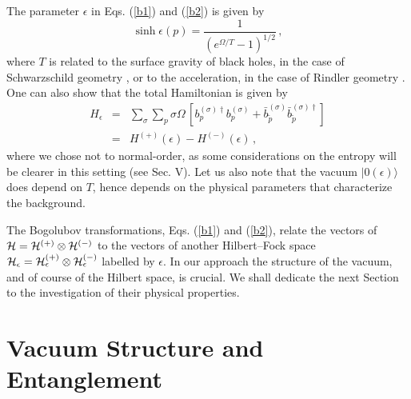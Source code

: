 \noindent The parameter $\epsilon$ in Eqs. (\ref{b1}) and
(\ref{b2}) is given by
\begin{equation}\label{boson-stat}
 \sinh \epsilon (p)= \frac{1}{(e^{\Omega/T}-1)^{1/2}}\,,
\end{equation}
where $T$ is related to the surface gravity of black holes, in the
case of Schwarzschild geometry \cite{HAW}, or to the acceleration,
in the case of Rindler geometry \cite{Unruh:db}. One can also show
that the total Hamiltonian is given by
\cite{birrell,HAW,Davies:1974th,Unruh:db,TAK,Iorio:2001te,umezawa}
\begin{eqnarray}
  H_{\epsilon} & = & \sum_{\sigma}\sum_p \sigma \Omega \,[ b_p^{(\sigma)
 \dagger} b_p^{(\sigma)} +
 \bar{b}_{\tilde{p}}^{(\sigma)}
 \bar{b}_{\tilde{p}}^{(\sigma)\dagger}] \nonumber \\
 &=& H^{(+)}(\epsilon) - H^{(-)}(\epsilon) \,{,}
 \label{hamrin}
 \end{eqnarray}
where we chose not to normal-order, as some considerations on the
entropy will be clearer in this setting (see Sec. V). Let us also
note that the vacuum $|0 (\epsilon) \rangle$ does depend on $T$,
hence depends on the physical parameters that characterize the
background.

\noindent The Bogolubov transformations, Eqs. (\ref{b1}) and
(\ref{b2}), relate the vectors of ${\cal H} = {\cal H}^{(+)}
\otimes {\cal H}^{(-)}$ to the vectors of another Hilbert--Fock
space ${\cal H}_{\epsilon} = {\cal H}^{(+)}_{\epsilon} \otimes
{\cal H}^{(-)}_{\epsilon}$ labelled by $\epsilon$. In our approach
the structure of the vacuum, and of course of the Hilbert space,
is crucial. We shall dedicate the next Section to the
investigation of their physical properties.

\section{Vacuum Structure and Entanglement}
\setcounter{equation}{0}

